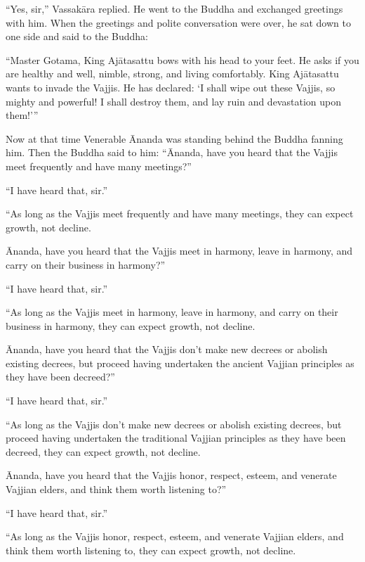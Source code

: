 \documentclass[12pt,openany]{book}%
\begin{document}
“Yes, sir,” \textsanskrit{Vassakāra} replied. He went to the Buddha and exchanged greetings with him. When the greetings and polite conversation were over, he sat down to one side and said to the Buddha: 

“Master Gotama, King \textsanskrit{Ajātasattu} bows with his head to your feet. He asks if you are healthy and well, nimble, strong, and living comfortably. King \textsanskrit{Ajātasattu} wants to invade the Vajjis. He has declared: ‘I shall wipe out these Vajjis, so mighty and powerful! I shall destroy them, and lay ruin and devastation upon them!’” 

Now at that time Venerable Ānanda was standing behind the Buddha fanning him. Then the Buddha said to him: “Ānanda, have you heard that the Vajjis meet frequently and have many meetings?” 

“I have heard that, sir.” 

“As long as the Vajjis meet frequently and have many meetings, they can expect growth, not decline. 

Ānanda, have you heard that the Vajjis meet in harmony, leave in harmony, and carry on their business in harmony?” 

“I have heard that, sir.” 

“As long as the Vajjis meet in harmony, leave in harmony, and carry on their business in harmony, they can expect growth, not decline. 

Ānanda, have you heard that the Vajjis don’t make new decrees or abolish existing decrees, but proceed having undertaken the ancient Vajjian principles as they have been decreed?” 

“I have heard that, sir.” 

“As long as the Vajjis don’t make new decrees or abolish existing decrees, but proceed having undertaken the traditional Vajjian principles as they have been decreed, they can expect growth, not decline. 

Ānanda, have you heard that the Vajjis honor, respect, esteem, and venerate Vajjian elders, and think them worth listening to?” 

“I have heard that, sir.” 

“As long as the Vajjis honor, respect, esteem, and venerate Vajjian elders, and think them worth listening to, they can expect growth, not decline. 
\end{document}
